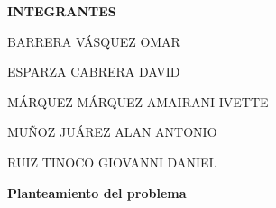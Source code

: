 \documentclass[12pt]{article}
\begin{document}

\par

\begin{Center}
{\fontsize{10pt}{12.0pt}\selectfont \textbf{INTEGRANTES}\par}
\end{Center}\par

\begin{Center}
{\fontsize{10pt}{12.0pt}\selectfont BARRERA VÁSQUEZ OMAR\par}
\end{Center}\par

\begin{Center}
{\fontsize{10pt}{12.0pt}\selectfont ESPARZA CABRERA DAVID\par}
\end{Center}\par

\begin{Center}
{\fontsize{10pt}{12.0pt}\selectfont MÁRQUEZ MÁRQUEZ AMAIRANI IVETTE\par}
\end{Center}\par

\begin{Center}
{\fontsize{10pt}{12.0pt}\selectfont MUÑOZ JUÁREZ ALAN ANTONIO\par}
\end{Center}\par

\begin{Center}
{\fontsize{10pt}{12.0pt}\selectfont RUIZ TINOCO GIOVANNI DANIEL\par}
\end{Center}\par


\vspace{\baselineskip}
\textbf{Planteamiento del problema }\par
\end{document}

